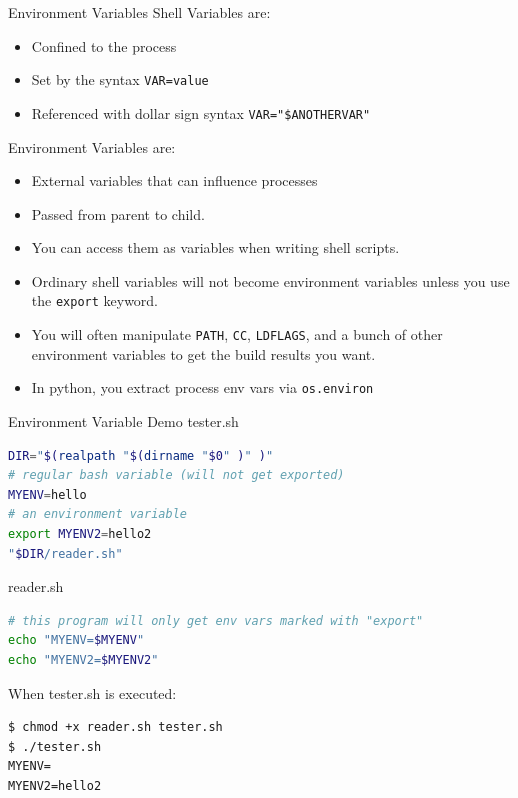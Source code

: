 \documentclass{../lecture}
\begin{document}
\begin{frame}[fragile]{Environment Variables}
Shell Variables are:
\begin{itemize}
  \item Confined to the process
  \item Set by the syntax \texttt{VAR=value}
  \item Referenced with dollar sign syntax \texttt{VAR="\$ANOTHERVAR"}
\end{itemize}
Environment Variables are:
\begin{itemize}
  \item External variables that can influence processes
  \item Passed from parent to child.
  \item You can access them as variables when writing shell scripts.
  \item Ordinary shell variables will not become environment variables unless
    you use the \texttt{export} keyword.
  \item You will often manipulate \texttt{PATH}, \texttt{CC}, \texttt{LDFLAGS},
    and a bunch of other environment variables to get the build results you
    want.
  \item In python, you extract process env vars via \texttt{os.environ}
\end{itemize}
\end{frame}

\begin{frame}[fragile]{Environment Variable Demo}
tester.sh
\begin{lstlisting}[language=bash]
DIR="$(realpath "$(dirname "$0" )" )"
# regular bash variable (will not get exported)
MYENV=hello
# an environment variable
export MYENV2=hello2
"$DIR/reader.sh"
\end{lstlisting}
reader.sh
\begin{lstlisting}[language=bash]
# this program will only get env vars marked with "export"
echo "MYENV=$MYENV"
echo "MYENV2=$MYENV2"
\end{lstlisting}
When tester.sh is executed:
\begin{lstlisting}
$ chmod +x reader.sh tester.sh
$ ./tester.sh
MYENV=
MYENV2=hello2
\end{lstlisting}
\end{frame}
\end{document}
